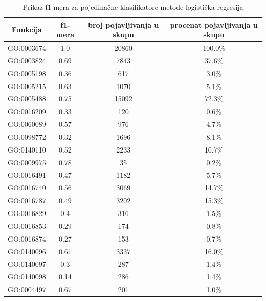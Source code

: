 \begin{table}[H]
	\centering
	\begin{tabular}{|c|c|c|c|}
		\hline
		Funkcija & f1-mera & broj pojavljivanja u skupu & procenat pojavljivanja u skupu \\
		\hline
		GO:0003674 & 1.0 & 20860 & 100.0\% \\
		\hline
		GO:0003824 & 0.69 & 7843 & 37.6\% \\
		\hline
		GO:0005198 & 0.36 & 617 & 3.0\% \\
		\hline
		GO:0005215 & 0.63 & 1070 & 5.1\% \\
		\hline
		GO:0005488 & 0.75 & 15092 & 72.3\% \\
		\hline
		GO:0016209 & 0.33 & 120 & 0.6\% \\
		\hline
		GO:0060089 & 0.57 & 976 & 4.7\% \\
		\hline
		GO:0098772 & 0.32 & 1696 & 8.1\% \\
		\hline
		GO:0140110 & 0.52 & 2233 & 10.7\% \\
		\hline
		GO:0009975 & 0.78 & 35 & 0.2\% \\
		\hline
		GO:0016491 & 0.47 & 1182 & 5.7\% \\
		\hline
		GO:0016740 & 0.56 & 3069 & 14.7\% \\
		\hline
		GO:0016787 & 0.49 & 3202 & 15.3\% \\
		\hline
		GO:0016829 & 0.4 & 316 & 1.5\% \\
		\hline
		GO:0016853 & 0.29 & 174 & 0.8\% \\
		\hline
		GO:0016874 & 0.27 & 153 & 0.7\% \\
		\hline
		GO:0140096 & 0.61 & 3337 & 16.0\% \\
		\hline
		GO:0140097 & 0.3 & 287 & 1.4\% \\
		\hline
		GO:0140098 & 0.14 & 286 & 1.4\% \\
		\hline
		GO:0004497 & 0.67 & 201 & 1.0\% \\
		\hline
	\end{tabular}
	\caption{Prikaz f1 mera za pojedina\v cne klasifikatore metode logistička regresija}
	\label{tab: lrF1}
\end{table}


